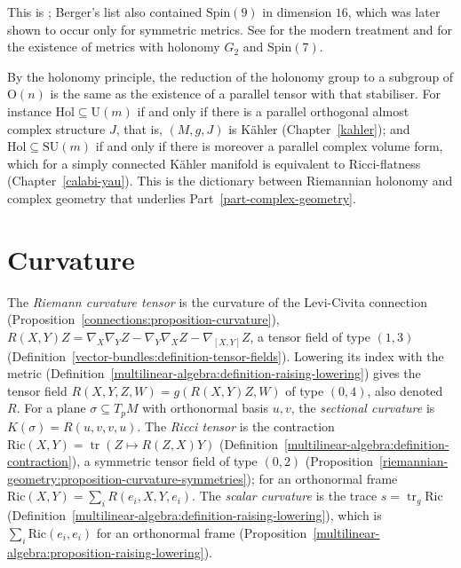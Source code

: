 This is \cite{berger-1955}; Berger's list also contained $\mathrm{Spin}(9)$ in dimension $16$, which was later shown to occur only for symmetric metrics. See \cite{joyce-special-holonomy} for the modern treatment and for the
existence of metrics with holonomy $G_2$ and $\mathrm{Spin}(7)$.

\begin{remark}\label{riemannian-geometry:remark-special-holonomy}
By the holonomy principle, the reduction of the holonomy group to a subgroup of $\mathrm{O}(n)$ is the same as the existence of a parallel tensor with that stabiliser. For instance $\mathrm{Hol} \subseteq \mathrm{U}(m)$ if and only
if there is a parallel orthogonal almost complex structure $J$, that is, $(M, g, J)$ is K\"ahler (Chapter~\ref{kahler}); and $\mathrm{Hol} \subseteq \mathrm{SU}(m)$ if and only if there is moreover a parallel complex volume form,
which for a simply connected K\"ahler manifold is equivalent to Ricci-flatness (Chapter~\ref{calabi-yau}). This is the dictionary between Riemannian holonomy and complex geometry that underlies Part~\ref{part-complex-geometry}.
\end{remark}

\section{Curvature}\label{riemannian-geometry:section-curvature}

\begin{definition}\label{riemannian-geometry:definition-curvature-tensor}
The \emph{Riemann curvature tensor} is the curvature of the Levi-Civita connection (Proposition~\ref{connections:proposition-curvature}),
$R(X, Y)Z = \nabla_X\nabla_YZ - \nabla_Y\nabla_XZ - \nabla_{[X,Y]}Z$, a tensor field of type $(1,3)$ (Definition~\ref{vector-bundles:definition-tensor-fields}). Lowering its index with the metric
(Definition~\ref{multilinear-algebra:definition-raising-lowering}) gives the tensor field $R(X, Y, Z, W) = g(R(X, Y)Z, W)$ of type $(0,4)$, also denoted $R$. For a plane $\sigma \subseteq T_pM$ with
orthonormal basis $u, v$, the \emph{sectional curvature} is $K(\sigma) = R(u, v, v, u)$. The \emph{Ricci tensor} is the contraction $\mathrm{Ric}(X, Y) = \operatorname{tr}(Z \mapsto R(Z, X)Y)$
(Definition~\ref{multilinear-algebra:definition-contraction}), a symmetric tensor field of type $(0,2)$ (Proposition~\ref{riemannian-geometry:proposition-curvature-symmetries}); for an orthonormal frame
$\mathrm{Ric}(X, Y) = \sum_iR(e_i, X, Y, e_i)$. The \emph{scalar curvature} is the trace $s = \operatorname{tr}_g\mathrm{Ric}$ (Definition~\ref{multilinear-algebra:definition-raising-lowering}), which
is $\sum_i\mathrm{Ric}(e_i, e_i)$ for an orthonormal frame (Proposition~\ref{multilinear-algebra:proposition-raising-lowering}).
\end{definition}


